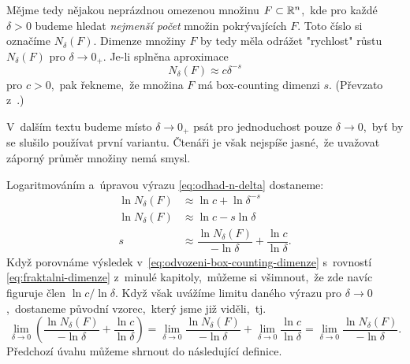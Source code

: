 Mějme tedy nějakou neprázdnou omezenou množinu $F\subset\mathbb{R}^n$,~kde pro každé $\delta>0$ budeme hledat \emph{nejmenší počet} množin pokrývajících $F$. Toto číslo si označíme $N_\delta(F)$. Dimenze množiny $F$ by tedy měla odrážet "rychlost" růstu $N_\delta(F)$ pro $\delta\to 0_+$. Je-li splněna aproximace
\begin{equation}\label{eq:odhad-n-delta}
    N_\delta(F)\approx c\delta^{-s}
\end{equation}
pro $c>0$,~pak řekneme,~že množina $F$ má box-counting dimenzi $s$. (Převzato z~\citep[str. 27]{Falconer2014}.)
\begin{remark}
    V~dalším textu budeme místo $\delta\to 0_+$ psát pro jednoduchost pouze $\delta\to 0$,~byť by se slušilo používat první variantu. Čtenáři je však nejspíše jasné,~že uvažovat záporný průměr množiny nemá smysl.
\end{remark}
Logaritmováním a~úpravou výrazu \eqref{eq:odhad-n-delta} dostaneme:
\begin{align}\label{eq:odvozeni-box-counting-dimenze}
    \ln{N_\delta(F)}&\approx\ln{c}+\ln{\delta^{-s}}\\
    \ln{N_\delta(F)}&\approx\ln{c}-s\ln{\delta}\\
    s&\approx\dfrac{\ln{N_\delta(F)}}{-\ln{\delta}}+\dfrac{\ln{c}}{\ln{\delta}}.
\end{align}
Když porovnáme výsledek v~\eqref{eq:odvozeni-box-counting-dimenze} s~rovností \eqref{eq:fraktalni-dimenze} z~minulé kapitoly,~můžeme si všimnout,~že zde navíc figuruje člen $\ln{c}/\ln{\delta}$. Když však uvážíme limitu daného výrazu pro $\delta\to 0$,~dostaneme původní vzorec,~který jsme již viděli,~tj.
\[\lim_{\delta\to 0}\left(\dfrac{\ln{N_\delta(F)}}{-\ln{\delta}}+\dfrac{\ln{c}}{\ln{\delta}}\right)=\lim_{\delta\to 0}\dfrac{\ln{N_\delta(F)}}{-\ln{\delta}}+\lim_{\delta\to 0}\dfrac{\ln{c}}{\ln{\delta}}=\lim_{\delta\to 0}\dfrac{\ln{N_\delta(F)}}{-\ln{\delta}}.\]
Předchozí úvahu můžeme shrnout do následující definice.
